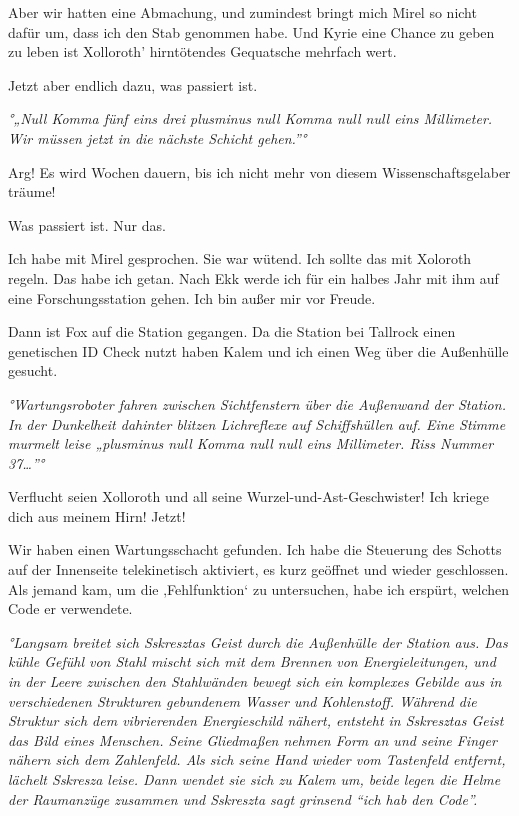 \documentclass[11pt]{scrartcl}
\begin{document}
Aber wir hatten eine Abmachung, und zumindest bringt mich Mirel so nicht
dafür um, dass ich den Stab genommen habe. Und Kyrie eine Chance zu
geben zu leben ist Xolloroth' hirntötendes Gequatsche mehrfach wert.

Jetzt aber endlich dazu, was passiert ist.

\emph{°„Null Komma fünf eins drei plusminus null Komma null null eins
Millimeter. Wir müssen jetzt in die nächste Schicht gehen.''°}

Arg! Es wird Wochen dauern, bis ich nicht mehr von diesem
Wissenschaftsgelaber träume!

Was passiert ist. Nur das.

Ich habe mit Mirel gesprochen. Sie war wütend. Ich sollte das mit
Xoloroth regeln. Das habe ich getan. Nach Ekk werde ich für ein halbes
Jahr mit ihm auf eine Forschungsstation gehen. Ich bin außer mir vor
Freude.

Dann ist Fox auf die Station gegangen. Da die Station bei Tallrock einen
genetischen ID Check nutzt haben Kalem und ich einen Weg über die
Außenhülle gesucht.

\emph{°Wartungsroboter fahren zwischen Sichtfenstern über die Außenwand
der Station. In der Dunkelheit dahinter blitzen Lichreflexe auf
Schiffshüllen auf. Eine Stimme murmelt leise „plusminus null Komma null
null eins Millimeter. Riss Nummer 37\ldots{}''°}

Verflucht seien Xolloroth und all seine Wurzel-und-Ast-Geschwister! Ich
kriege dich aus meinem Hirn! Jetzt!

Wir haben einen Wartungsschacht gefunden. Ich habe die Steuerung des
Schotts auf der Innenseite telekinetisch aktiviert, es kurz geöffnet und
wieder geschlossen. Als jemand kam, um die ‚Fehlfunktion` zu
untersuchen, habe ich erspürt, welchen Code er verwendete.

\emph{°Langsam breitet sich Sskresztas Geist durch die Außenhülle der
Station aus. Das kühle Gefühl von Stahl mischt sich mit dem Brennen von
Energieleitungen, und in der Leere zwischen den Stahlwänden bewegt sich
ein komplexes Gebilde aus in verschiedenen Strukturen gebundenem Wasser
und Kohlenstoff. Während die Struktur sich dem vibrierenden
Energieschild nähert, entsteht in Sskresztas Geist das Bild eines
Menschen. Seine Gliedmaßen nehmen Form an und seine Finger nähern sich
dem Zahlenfeld. Als sich seine Hand wieder vom Tastenfeld entfernt,
lächelt Sskresza leise. Dann wendet sie sich zu Kalem um, beide legen
die Helme der Raumanzüge zusammen und Sskreszta sagt grinsend ``ich hab
den Code''.}
\end{document}
